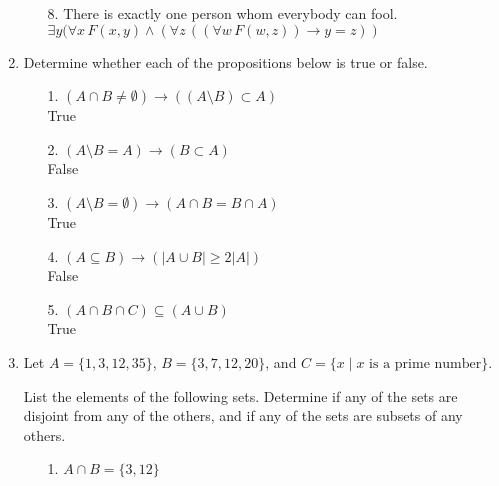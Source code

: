 \documentclass[11pt]{article}
\begin{document}
\begin{enumerate}
\begin{enumerate}
  \item[8.] There is exactly one person whom everybody can fool.\\
  
$\exists y ( \forall x \, F(x,y) \land ( \forall z \, (( \forall w \, F(w,z) ) \rightarrow y = z ))$


  \end{enumerate}

\newpage
\item Determine whether each of the propositions below is true or false.\\


  \begin{enumerate}
  \item[1.] $(A \cap B \neq \emptyset) \rightarrow ((A \setminus B) \subset A)$\\
    True\\
    
  \item[2.] $(A \setminus B = A) \rightarrow (B \subset A)$\\
    False\\
    
  \item[3.] $(A \setminus B = \emptyset) \rightarrow (A \cap B = B \cap A)$\\
    True\\
    
  \item[4.] $(A \subseteq B) \rightarrow (|A \cup B| \geq 2|A|)$\\
    False\\

  \item[5.] $(A \cap B \cap C) \subseteq (A \cup B)$\\
  True\\
  

  \end{enumerate}

\newpage
\item Let $A = \{1, 3, 12, 35\}$, $B = \{3, 7, 12, 20\}$, and $C = \{x \mid x \text{ is a prime number}\}$. 

List the elements of the following sets. Determine if any of the sets are disjoint from any of the others, and if any of the sets are subsets of any others.

  \begin{enumerate}
  \item[1.] $A \cap B = \{3, 12\}$ \\
  


\end{enumerate}
\end{enumerate}
\end{document}
